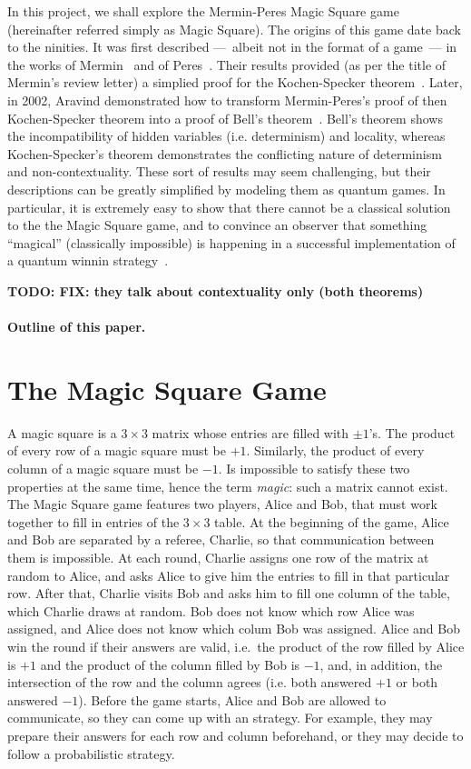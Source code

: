 \documentclass{llncs}
\newcommand{\todo}[1]{{\color{red}\bfseries{}TODO: #1}}
\begin{document}
In this project, we shall explore the Mermin-Peres Magic Square game
(hereinafter referred simply as Magic Square). The origins of this
game date back to the ninities. It was first described ---~albeit not
in the format of a game~--- in the works of Mermin~\cite{mermin:1990}
and of Peres~\cite{peres:1990}. Their results provided (as per the
title of Mermin's review letter) a simplied proof for the
Kochen-Specker theorem~\cite{Kocher1975}. Later, in 2002, Aravind
demonstrated how to transform Mermin-Peres's proof of then
Kochen-Specker theorem into a proof of Bell's
theorem~\cite{aravind:xxx}. Bell's theorem shows the incompatibility
of hidden variables (i.e. determinism) and locality, whereas
Kochen-Specker's theorem demonstrates the conflicting nature of
determinism and non-contextuality.  These sort of results may seem
challenging, but their descriptions can be greatly simplified by
modeling them as quantum games.  In particular, it is extremely easy
to show that there cannot be a classical solution to the the Magic
Square game, and to convince an observer that something ``magical''
(classically impossible) is happening in a successful implementation
of a quantum winnin strategy~\cite{brassard:2005}.

\todo{FIX: they talk about contextuality only (both theorems)}

\paragraph{Outline of this paper.}

\section{The Magic Square Game}
\label{sec:magic-square}

A magic square is a \(3 \times 3\) matrix whose entries are filled
with \(\pm 1\)'s. The product of every row of a magic square must be
\(+1\). Similarly, the product of every column of a magic square must
be \(-1\). Is impossible to satisfy these two properties at the same
time, hence the term \emph{magic}: such a matrix cannot exist. The
Magic Square game features two players, Alice and Bob, that must work
together to fill in entries of the \(3 \times 3\) table.  At the
beginning of the game, Alice and Bob are separated by a referee,
Charlie, so that communication between them is impossible. At each
round, Charlie assigns one row of the matrix at random to Alice, and
asks Alice to give him the entries to fill in that particular
row. After that, Charlie visits Bob and asks him to fill one column of
the table, which Charlie draws at random.  Bob does not know which row
Alice was assigned, and Alice does not know which colum Bob was
assigned. Alice and Bob win the round if their answers are valid,
i.e.\ the product of the row filled by Alice is \(+1\) and the product
of the column filled by Bob is \(-1\), and, in addition, the
intersection of the row and the column agrees (i.e. both answered
\(+1\) or both answered \(-1\)). Before the game starts, Alice and Bob
are allowed to communicate, so they can come up with an strategy.  For
example, they may prepare their answers for each row and column
beforehand, or they may decide to follow a probabilistic strategy.
\end{document}
